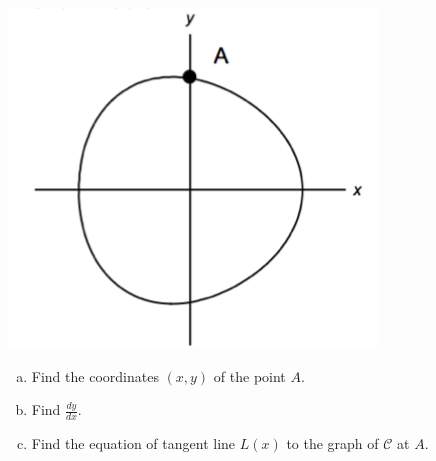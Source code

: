 \documentclass[11pt]{exam}
\begin{document}
\begin{questions}
\begin{multicols}{2}
\begin{center}
    \includegraphics[scale=0.3]{Figures/curvec}
  \end{center}
\begin{enumerate}[(a)]
\item Find the coordinates $(x,y)$ of the point $A$.
\item Find $\displaystyle\frac{dy}{dx}$. 
\item Find the equation of tangent line $L(x)$ to the graph of $\mathcal{C}$ at $A$.


\end{enumerate}
\end{multicols}
\end{questions}
\end{document}
